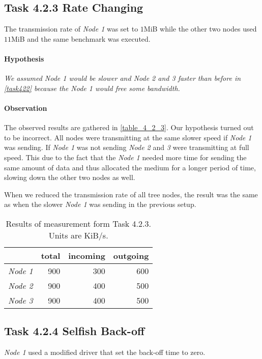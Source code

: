 \documentclass[12pt,a4paper]{article}
\begin{document}
\subsection{Task 4.2.3 Rate Changing}
The transmission rate of \emph{Node 1} was set to $1$MiB while the other two nodes used $11$MiB and the same benchmark was executed.

\paragraph{Hypothesis}
\emph{We assumed \emph{Node 1} would be slower and \emph{Node 2} and \emph{3} faster than before in \autoref{task422} because the \emph{Node 1} would free some bandwidth.}

\paragraph{Observation}
The observed results are gathered in \autoref{table_4_2_3}.
Our hypothesis turned out to be incorrect.
All nodes were transmitting at the same slower speed if \emph{Node 1} was sending.
If \emph{Node 1} was not sending \emph{Node 2} and \emph{3} were transmitting at full speed.
This due to the fact that the \emph{Node 1} needed more time for sending the same amount of data and thus allocated the medium for a longer period of time, slowing down the other two nodes as well.

When we reduced the transmission rate of all tree nodes, the result was the same as when the slower \emph{Node 1} was sending in the previous setup.

\begin{table}
	\begin{center}
		\begin{tabular}{r|r|r|r}\
		 & total & incoming & outgoing \\
		 \hline 
		 \emph{Node 1} & 900 & 300 & 600 \\
		 \emph{Node 2} & 900 & 400 & 500 \\
		 \emph{Node 3} & 900 & 400 & 500 \\
		\end{tabular}
		
		\caption{Results of measurement form Task 4.2.3. Units are KiB/s.}
		\label{table_4_2_3}
	\end{center}
	\end{table}

\subsection{Task 4.2.4 Selfish Back-off}
\emph{Node 1} used a modified driver that set the back-off time to zero.
\end{document}
